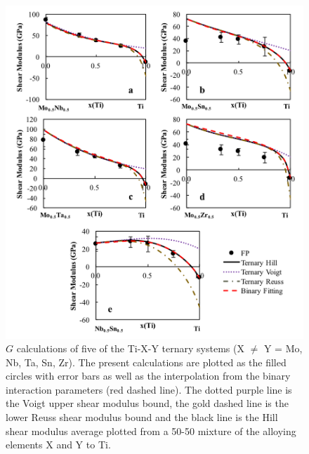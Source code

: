 \pagebreak
\begin{figure}[H]
	\centering
	\includegraphics[width=\textwidth]{Chapter-6/Figures/tixyshear1.png}
	\caption{$G$ calculations of five of the Ti-X-Y ternary systems (X $\neq$ Y = Mo, Nb, Ta, Sn, Zr). The present calculations are plotted as the filled circles with error bars as well as the interpolation from the binary interaction parameters (red dashed line). The dotted purple line is the Voigt upper shear modulus bound, the gold dashed line is the lower Reuss shear modulus bound and the black line is the Hill shear modulus average plotted from a 50-50 mixture of the alloying elements X and Y to Ti.}
	\label{Ch6-figure:tixyshear1}
\end{figure}

